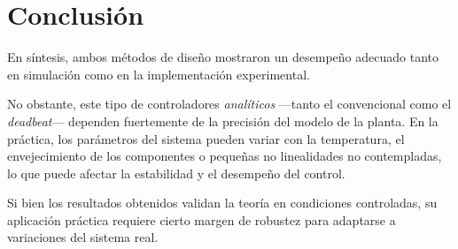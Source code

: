 \section{Conclusión}

En síntesis, ambos métodos de diseño mostraron un desempeño adecuado tanto en simulación como en la implementación experimental.  

No obstante, este tipo de controladores \textit{analíticos} —tanto el convencional como el \textit{deadbeat}— dependen fuertemente de la precisión del modelo de la planta.  
En la práctica, los parámetros del sistema pueden variar con la temperatura, el envejecimiento de los componentes o pequeñas no linealidades no contempladas, lo que puede afectar la estabilidad y el desempeño del control.  

Si bien los resultados obtenidos validan la teoría en condiciones controladas, su aplicación práctica requiere cierto margen de robustez para adaptarse a variaciones del sistema real.
